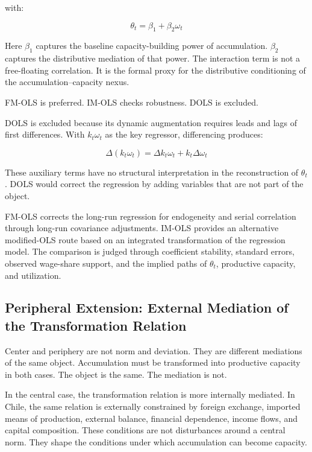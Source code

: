 with:

\begin{equation}
\theta_t=\beta_1+\beta_2\omega_t
\end{equation}


Here $\beta_1$ captures the baseline capacity-building power of accumulation. $\beta_2$ captures the distributive mediation of that power. The interaction term is not a free-floating correlation. It is the formal proxy for the distributive conditioning of the accumulation–capacity nexus.

FM-OLS is preferred. IM-OLS checks robustness. DOLS is excluded.

DOLS is excluded because its dynamic augmentation requires leads and lags of first differences. With $k_t\omega_t$ as the key regressor, differencing produces:

\begin{equation}
\Delta(k_t\omega_t)
=
\Delta k_t \omega_t
+
k_t \Delta \omega_t
\end{equation}

These auxiliary terms have no structural interpretation in the reconstruction of $\theta_t$. DOLS would correct the regression by adding variables that are not part of the object.

FM-OLS corrects the long-run regression for endogeneity and serial correlation through long-run covariance adjustments. IM-OLS provides an alternative modified-OLS route based on an integrated transformation of the regression model. The comparison is judged through coefficient stability, standard errors, observed wage-share support, and the implied paths of $\theta_t$, productive capacity, and utilization.



\subsection{Peripheral Extension: External Mediation of the Transformation Relation}

Center and periphery are not norm and deviation. They are different mediations of the same object. Accumulation must be transformed into productive capacity in both cases. The object is the same. The mediation is not.

In the central case, the transformation relation is more internally mediated. In Chile, the same relation is externally constrained by foreign exchange, imported means of production, external balance, financial dependence, income flows, and capital composition. These conditions are not disturbances around a central norm. They shape the conditions under which accumulation can become capacity.

